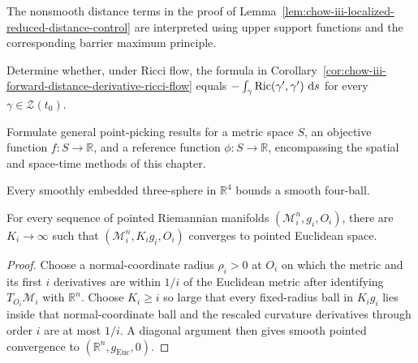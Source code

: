 \begin{remark}
\label{rem:chow-iii-localized-barrier-nonsmoothness}

The nonsmooth distance terms in the proof of
Lemma~\ref{lem:chow-iii-localized-reduced-distance-control} are interpreted
using upper support functions and the corresponding barrier maximum
principle.
\end{remark}

\begin{example}
\label{ex:chow-iii-distance-derivative-any-minimizer}
Determine whether, under Ricci flow, the formula in
Corollary~\ref{cor:chow-iii-forward-distance-derivative-ricci-flow} equals
\(-\int_\gamma\operatorname{Ric}(\gamma',\gamma')\,\,\mathrm{d} s\) for every
\(\gamma\in\mathcal Z(t_0)\).
\end{example}

\begin{example}
\label{ex:chow-iii-general-point-picking}
Formulate general point-picking results for a metric space \(S\), an objective
function \(f:S\to\mathbb R\), and a reference function
\(\phi:S\to\mathbb R\), encompassing the spatial and space-time methods of
this chapter.
\end{example}

\begin{example}
\label{ex:chow-iii-smooth-schoenflies-four}
Every smoothly embedded three-sphere in \(\mathbb R^4\) bounds a smooth
four-ball.
\end{example}

\begin{example}
\label{ex:chow-iii-trivial-limits-rescaling}
For every sequence of pointed Riemannian manifolds
\((\mathcal M_i^n,g_i,O_i)\), there are \(K_i\to\infty\) such that
\((\mathcal M_i^n,K_ig_i,O_i)\) converges to pointed Euclidean space.
\end{example}
\begin{proof}
Choose a normal-coordinate radius \(\rho_i>0\) at \(O_i\) on which the metric
and its first \(i\) derivatives are within \(1/i\) of the Euclidean metric
after identifying \(T_{O_i}\mathcal M_i\) with \(\mathbb R^n\).  Choose
\(K_i\ge i\) so large that every fixed-radius ball in \(K_ig_i\) lies inside
that normal-coordinate ball and the rescaled curvature derivatives through
order \(i\) are at most \(1/i\).  A diagonal argument then gives smooth
pointed convergence to \((\mathbb R^n,g_{\mathrm{Euc}},0)\).
\end{proof}
